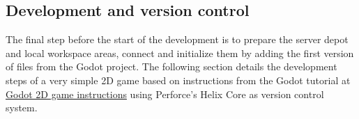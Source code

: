 \subsection{Development and version control}
The final step before the start of the development is to prepare the server depot and local workspace areas, connect 
and initialize them by adding the first version of files from the Godot project. 
The following section details the development steps of a very simple 2D game based on instructions from the Godot 
tutorial at \href{https://docs.godotengine.org/en/stable/getting_started/first_2d_game/index.html}{\color{blue}Godot 2D game instructions}
using Perforce's Helix Core as version control system.
